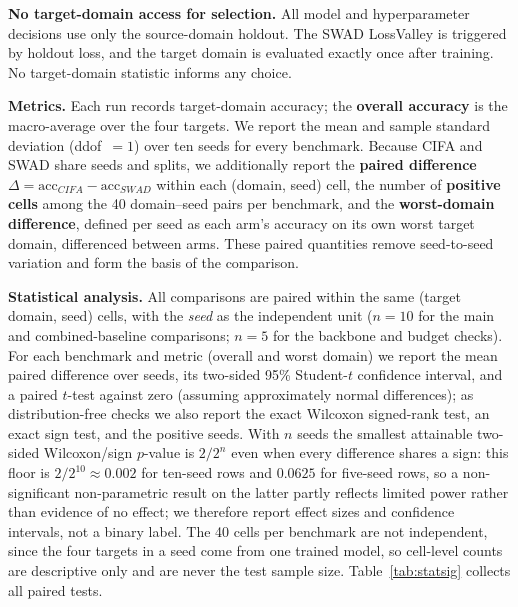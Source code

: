 \documentclass[electronics,article,submit,moreauthors]{Definitions/mdpi}
\begin{document}
\textbf{No target-domain access for selection.} All model and hyperparameter decisions use only the source-domain holdout. The SWAD LossValley is triggered by holdout loss, and the target domain is evaluated exactly once after training. No target-domain statistic informs any choice.

\textbf{Metrics.} Each run records target-domain accuracy; the \textbf{overall accuracy} is the macro-average over the four targets. We report the mean and sample standard deviation (ddof~$=1$) over ten seeds for every benchmark. Because CIFA and SWAD share seeds and splits, we additionally report the \textbf{paired difference} $\Delta=\text{acc}_{CIFA}-\text{acc}_{SWAD}$ within each (domain, seed) cell, the number of \textbf{positive cells} among the 40 domain--seed pairs per benchmark, and the \textbf{worst-domain difference}, defined per seed as each arm's accuracy on its own worst target domain, differenced between arms. These paired quantities remove seed-to-seed variation and form the basis of the comparison.

\textbf{Statistical analysis.} All comparisons are paired within the same (target domain, seed) cells, with the \emph{seed} as the independent unit ($n=10$ for the main and combined-baseline comparisons; $n=5$ for the backbone and budget checks). For each benchmark and metric (overall and worst domain) we report the mean paired difference over seeds, its two-sided 95\% Student-$t$ confidence interval, and a paired $t$-test against zero (assuming approximately normal differences); as distribution-free checks we also report the exact Wilcoxon signed-rank test, an exact sign test, and the positive seeds. With $n$ seeds the smallest attainable two-sided Wilcoxon/sign $p$-value is $2/2^{n}$ even when every difference shares a sign: this floor is $2/2^{10}\approx0.002$ for ten-seed rows and $0.0625$ for five-seed rows, so a non-significant non-parametric result on the latter partly reflects limited power rather than evidence of no effect; we therefore report effect sizes and confidence intervals, not a binary label. The 40 cells per benchmark are not independent, since the four targets in a seed come from one trained model, so cell-level counts are descriptive only and are never the test sample size. Table~\ref{tab:statsig} collects all paired tests.
\end{document}
